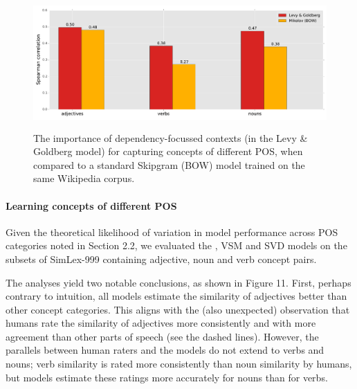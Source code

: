 \begin{figure}[]  \includegraphics[width = \textwidth,height=5cm]{Chapter_3/New_Figure_2_CL}  \caption{The importance of dependency-focussed contexts (in the Levy \& Goldberg model) for capturing concepts of different POS, when compared to a standard Skipgram (BOW) model trained on the same Wikipedia corpus.}\end{figure}



\paragraph{\bf Learning concepts of different POS}

Given the theoretical likelihood of variation in model performance across POS categories noted in Section 2.2, we evaluated the \cite{mikolov2013efficient}, VSM and SVD models on the subsets of SimLex-999 containing adjective, noun and verb concept pairs. 

The analyses yield two notable conclusions, as shown in Figure 11. First, perhaps contrary to intuition, all models estimate the similarity of adjectives better than other concept categories. This aligns with the (also unexpected) observation that humans rate the similarity of adjectives more consistently and with more agreement than other parts of speech (see the dashed lines). However, the parallels between human raters and the models do not extend to verbs and nouns; verb similarity is rated more consistently than noun similarity by humans, but models estimate these ratings more accurately for nouns than for verbs. 

